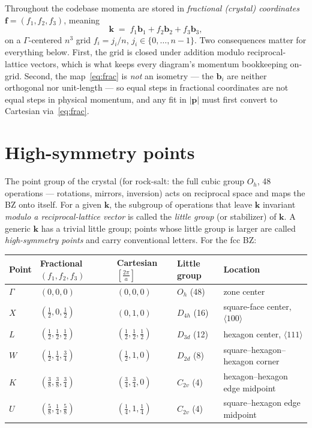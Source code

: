 \documentclass[11pt]{article}
\newcommand{\kv}{\mathbf{k}}
\newcommand{\pv}{\mathbf{p}}
\newcommand{\bv}{\mathbf{b}}
\begin{document}
Throughout the codebase momenta are stored in \emph{fractional (crystal) coordinates}
$\mathbf{f}=(f_{1},f_{2},f_{3})$, meaning
\begin{equation}
\kv \;=\; f_{1}\bv_{1}+f_{2}\bv_{2}+f_{3}\bv_{3},
\label{eq:frac}
\end{equation}
on a $\Gamma$-centered $n^{3}$ grid $f_{i}=j_{i}/n$, $j_{i}\in\{0,\dots,n-1\}$. Two
consequences matter for everything below. First, the grid is closed under addition
modulo reciprocal-lattice vectors, which is what keeps every diagram's momentum
bookkeeping on-grid. Second, the map~\eqref{eq:frac} is \emph{not} an isometry --- the
$\bv_{i}$ are neither orthogonal nor unit-length --- so equal steps in fractional
coordinates are not equal steps in physical momentum, and any fit in $|\pv|$ must first
convert to Cartesian via~\eqref{eq:frac}.

\section{High-symmetry points}
\label{sec:points}

The point group of the crystal (for rock-salt: the full cubic group $O_{h}$, 48
operations --- rotations, mirrors, inversion) acts on reciprocal space and maps the BZ
onto itself. For a given $\kv$, the subgroup of operations that leave $\kv$ invariant
\emph{modulo a reciprocal-lattice vector} is called the \emph{little group} (or
stabilizer) of $\kv$. A generic $\kv$ has a trivial little group; points whose little
group is larger are called \emph{high-symmetry points} and carry conventional letters.
For the fcc BZ:

\begin{center}
\begin{tabular}{l l l l l}
\hline
Point & Fractional $(f_{1},f_{2},f_{3})$ & Cartesian $[\tfrac{2\pi}{a}]$ & Little group & Location \\
\hline
$\Gamma$ & $(0,0,0)$                     & $(0,0,0)$                     & $O_{h}$ (48)  & zone center \\
$X$      & $(\tfrac12,0,\tfrac12)$       & $(0,1,0)$                     & $D_{4h}$ (16) & square-face center, $\langle100\rangle$ \\
$L$      & $(\tfrac12,\tfrac12,\tfrac12)$& $(\tfrac12,\tfrac12,\tfrac12)$& $D_{3d}$ (12) & hexagon center, $\langle111\rangle$ \\
$W$      & $(\tfrac12,\tfrac14,\tfrac34)$& $(\tfrac12,1,0)$              & $D_{2d}$ (8)  & square--hexagon--hexagon corner \\
$K$      & $(\tfrac38,\tfrac38,\tfrac34)$& $(\tfrac34,\tfrac34,0)$       & $C_{2v}$ (4)  & hexagon--hexagon edge midpoint \\
$U$      & $(\tfrac58,\tfrac14,\tfrac58)$& $(\tfrac14,1,\tfrac14)$       & $C_{2v}$ (4)  & square--hexagon edge midpoint \\
\hline
\end{tabular}
\end{center}
\end{document}
